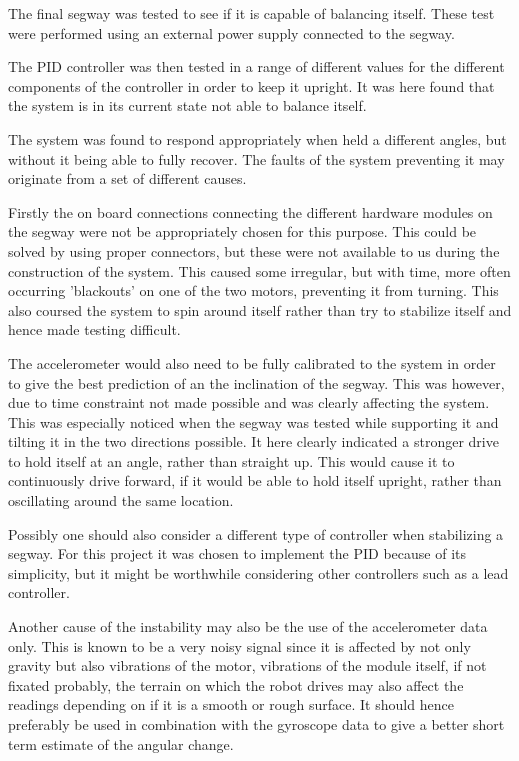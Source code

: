 The final segway was tested to see if it is capable of balancing itself.
These test were performed using an external power supply connected to the segway.

The PID controller was then tested in a range of different values for the different components of the controller in order to keep it upright.
It was here found that the system is in its current state not able to balance itself.

The system was found to respond appropriately when held a different angles, but without it being able to fully recover.
The faults of the system preventing it may originate from a set of different causes.

Firstly the on board connections connecting the different hardware modules on the segway were not be appropriately chosen for this purpose.
This could be solved by using proper connectors, but these were not available to us during the construction of the system.
This caused some irregular, but with time, more often occurring 'blackouts' on one of the two motors, preventing it from turning.
This also coursed the system to spin around itself rather than try to stabilize itself and hence made testing difficult.

The accelerometer would also need to be fully calibrated to the system in order to give the best prediction of an the inclination of the segway.
This was however, due to time constraint not made possible and was clearly affecting the system.
This was especially noticed when the segway was tested while supporting it and tilting it in the two directions possible.
It here clearly indicated a stronger drive to hold itself at an angle, rather than straight up.
This would cause it to continuously drive forward, if it would be able to hold itself upright, rather than oscillating around the same location.

Possibly one should also consider a different type of controller when stabilizing a segway.
For this project it was chosen to implement the PID because of its simplicity, but it might be worthwhile considering other controllers such as a lead controller.

Another cause of the instability may also be the use of the accelerometer data only.
This is known to be a very noisy signal since it is affected by not only gravity but also vibrations of the motor, vibrations of the module itself, if not fixated probably, the terrain on which the robot drives may also affect the readings depending on if it is a smooth or rough surface.
It should hence preferably be used in combination with the gyroscope data to give a better short term estimate of the angular change.